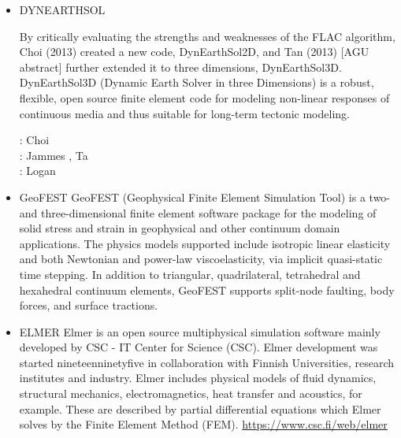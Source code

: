 \begin{itemize}
\item {\codefont DYNEARTHSOL} 

By critically evaluating the strengths and weaknesses of the
FLAC algorithm, Choi \etal (2013) created a new code, DynEarthSol2D, 
and Tan \etal (2013) [AGU abstract] further extended it to three
dimensions, DynEarthSol3D. DynEarthSol3D (Dynamic Earth Solver
in three Dimensions) is a robust, flexible, open source finite
element code for modeling non-linear responses of continuous
media and thus suitable for long-term tectonic modeling.

\begin{scriptsize} 
\twothousandthirteen: Choi \etal \cite{chtl13}\\
\twothousandfifteen: Jammes \etal \cite{jalr15}, Ta \etal \cite{tact15}\\
\twothousandseventeen: Logan \etal \cite{lolc17}
\end{scriptsize} 

\item {\codefont GeoFEST} 
GeoFEST (Geophysical Finite Element Simulation Tool) is a two- and three-dimensional finite
element software package for the modeling of solid stress and strain in geophysical and 
other continuum domain applications.
The physics models supported include isotropic linear elasticity and both Newtonian and power-law
viscoelasticity, via implicit quasi-static time stepping. In addition to triangular, 
quadrilateral, tetrahedral and hexahedral continuum elements, GeoFEST supports split-node 
faulting, body forces, and surface tractions.


{\small
\noindent
\cite{paln08}
}

\item {\codefont ELMER} 
Elmer is an open source multiphysical simulation software mainly developed by 
CSC - IT Center for Science (CSC). Elmer development was started nineteenninetyfive in collaboration with 
Finnish Universities, research institutes and industry. Elmer includes physical models of 
fluid dynamics, structural mechanics, electromagnetics, heat transfer and acoustics, 
for example. These are described by partial differential equations which Elmer solves 
by the Finite Element Method (FEM). \url{https://www.csc.fi/web/elmer}


\end{itemize}
